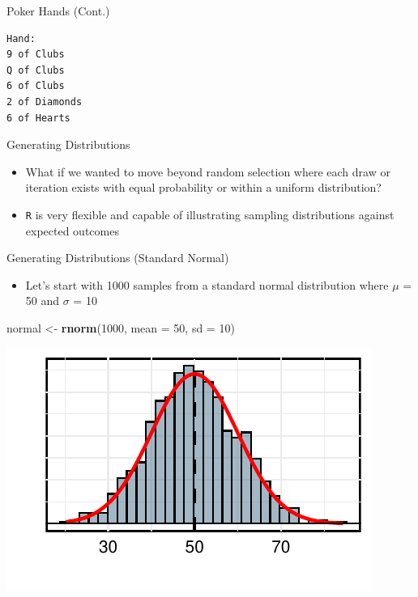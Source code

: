 \documentclass[
  ignorenonframetext,
]{beamer}
\newenvironment{Shaded}{\begin{snugshade}}{\end{snugshade}}
\newcommand{\AttributeTok}[1]{\textcolor[rgb]{0.13,0.29,0.53}{#1}}
\newcommand{\DecValTok}[1]{\textcolor[rgb]{0.00,0.00,0.81}{#1}}
\newcommand{\FunctionTok}[1]{\textcolor[rgb]{0.13,0.29,0.53}{\textbf{#1}}}
\newcommand{\NormalTok}[1]{#1}
\newcommand{\OtherTok}[1]{\textcolor[rgb]{0.56,0.35,0.01}{#1}}
\providecommand{\tightlist}{%
  \setlength{\itemsep}{0pt}\setlength{\parskip}{0pt}}
\begin{document}
\begin{frame}[fragile]{Poker Hands (Cont.)}
\label{poker-hands-cont.}
\begin{verbatim}
Hand: 
9 of Clubs
Q of Clubs
6 of Clubs
2 of Diamonds
6 of Hearts
\end{verbatim}
\end{frame}

\begin{frame}{Generating Distributions}
\label{generating-distributions}
\begin{itemize}
\tightlist
\item
  What if we wanted to move beyond random selection where each draw or
  iteration exists with equal probability or within a uniform
  distribution?

  \par \vspace{5mm}
\item
  \texttt{R} is very flexible and capable of illustrating sampling
  distributions against expected outcomes
\end{itemize}
\end{frame}

\begin{frame}[fragile]{Generating Distributions (Standard Normal)}
\label{generating-distributions-standard-normal}
\begin{itemize}
\tightlist
\item
  Let's start with 1000 samples from a standard normal distribution
  where \(\mu\) = 50 and \(\sigma\) = 10
\end{itemize}

\begin{Shaded}
\begin{Highlighting}[]
\NormalTok{normal }\OtherTok{\textless{}{-}} \FunctionTok{rnorm}\NormalTok{(}\DecValTok{1000}\NormalTok{, }\AttributeTok{mean =} \DecValTok{50}\NormalTok{, }\AttributeTok{sd =} \DecValTok{10}\NormalTok{)}
\end{Highlighting}
\end{Shaded}

\begin{center}\includegraphics{Class_2_Intermediate_R_Programming_files/figure-beamer/normal_distribution_figure-1} \end{center}
\end{frame}
\end{document}

